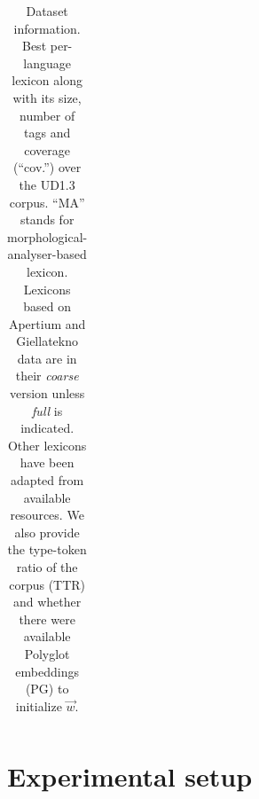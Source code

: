 \documentclass[11pt,a4paper]{article}
\begin{document}
\begin{table}[t]
\begin{tabular}{llrrr|rr}

\bottomrule
\end{tabular}
\caption{Dataset information. Best per-language lexicon along with its size, number of tags and coverage (``cov.'') over the UD1.3
  corpus. ``MA'' stands for morphological-analyser-based lexicon. Lexicons based on Apertium and Giellatekno
  data are in their {\em coarse} version unless {\em full} is indicated. Other lexicons
  have been adapted from available resources.\footnotemark{} We also provide the type-token ratio of the 
  corpus (TTR) and whether there were available Polyglot embeddings (PG) to initialize $\vec{w}$.}\label{tbl:lex}
\end{table}


\section{Experimental setup}
\end{document}
